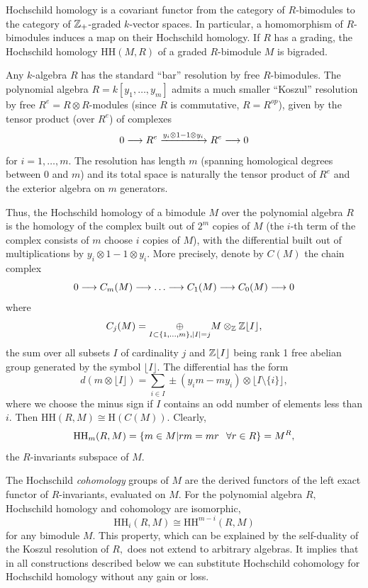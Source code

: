 \documentclass[12pt]{article}
\newcommand{\oplusop}[1]{{\mathop{\oplus}\limits_{#1}}}
\begin{document}
Hochschild homology is a covariant functor from the category 
of $R$-bimodules to the category of $\mathbb Z_+$-graded $k$-vector spaces. 
In particular, a homomorphism of $R$-bimodules induces a map on their 
Hochschild homology. 
If $R$ has a grading, the Hochschild homology $\mathrm{HH}(M,R)$ 
of a graded $R$-bimodule $M$ is bigraded. 

\vspace{0.1in} 

Any $k$-algebra $R$ has the standard ``bar'' resolution by free 
$R$-bimodules. The polynomial algebra $R=k[y_1, \dots, y_m]$ admits 
a much smaller ``Koszul'' resolution by free $R^e=R\otimes R$-modules 
(since $R$ is commutative,  $R= R^{op}$), given by the tensor product 
(over $R^e$) of complexes 
$$0 \longrightarrow R^e \xrightarrow{y_i \otimes 1 - 1\otimes y_i} R^e \longrightarrow 0 $$ 
for $i=1, \dots, m.$ 
The resolution has length $m$ (spanning homological degrees between $0$ and 
$m$) and its total space is naturally the tensor 
product of $R^e$ and the exterior algebra on $m$ generators. 

Thus, the Hochschild homology of a bimodule $M$ over the polynomial 
algebra $R$ is the homology of the complex built out of $2^m$ copies 
of $M$ (the $i$-th term of the complex consists of  $m$ choose $i$   
copies of $M$), with the differential built out of multiplications by 
$y_i\otimes 1 - 1\otimes y_i.$ More precisely, denote by $C(M)$ the 
chain complex 
$$ 0 \lra C_m(M) \lra \dots \lra C_1(M) \lra C_0(M) \lra 0$$ 
where
 $$C_j(M) = \oplusop{I\subset \{1, \dots, m\}, |I|=j} M\otimes_{\Z} \Z 
 \lfloor I \rfloor ,$$
the sum over all subsets $I$  of cardinality $j$ and $\mathbb Z \lfloor I\rfloor$ 
being rank 1 free abelian group generated by the symbol $\lfloor I\rfloor.$ 
The differential has the form 
$$ d(m\otimes \lfloor I\rfloor) = \sum_{i\in I} \pm (y_i m - my_i) 
\otimes \lfloor I\setminus \{i\}  \rfloor, $$
where we choose the minus sign if $I$ contains an odd number of elements less 
than $i.$ Then $\mathrm{HH}(R,M) \cong \mathrm{H}(C(M)).$
Clearly, 
$$\mathrm{HH}_m(R,M) = \{m\in M| rm=mr \hspace{0.1in} 
\forall r\in R\} =M^R,$$ 
the $R$-invariants subspace of $M.$ 

The Hochschild \emph{cohomology} groups 
of $M$ are the derived functors of the left exact 
functor of $R$-invariants, evaluated on $M$.  For the polynomial 
algebra $R,$ Hochschild homology and cohomology are isomorphic,  
$$ \mathrm{HH}_i(R,M) \cong \mathrm{HH}^{m-i}(R,M)$$ 
for any bimodule $M.$ This property, which can be explained by the self-duality of 
the Koszul resolution of $R,$ does not extend to arbitrary algebras. It implies that 
in all constructions described below we can substitute 
Hochschild cohomology for Hochschild homology without any gain or loss. 
\end{document}
